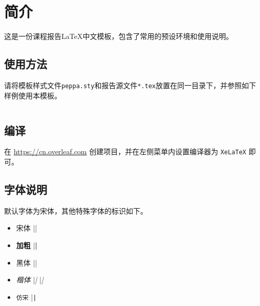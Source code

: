 \section{简介}

这是一份课程报告\LaTeX 中文模板，包含了常用的预设环境和使用说明。

\subsection{使用方法}

请将模板样式文件\texttt{peppa.sty}和报告源文件\texttt{*.tex}放置在同一目录下，并参照如下样例使用本模板。

\inputminted{latex}{src/template-usage.tex}

\subsection{编译}
在 \url{https://cn.overleaf.com} 创建项目，并在左侧菜单内设置编译器为 \texttt{XeLaTeX} 即可。

\subsection{字体说明}
默认字体为宋体，其他特殊字体的标识如下。

\begin{itemize}
    \item \textrm{宋体} \latex|\textrm|
    \item \textbf{加粗} \latex|\textbf|
    \item \textsf{黑体} \latex|\textsf|
    \item \textit{楷体} \latex|\textit| \latex|\emph|
    \item \texttt{仿宋} \latex|\texttt|
\end{itemize}
